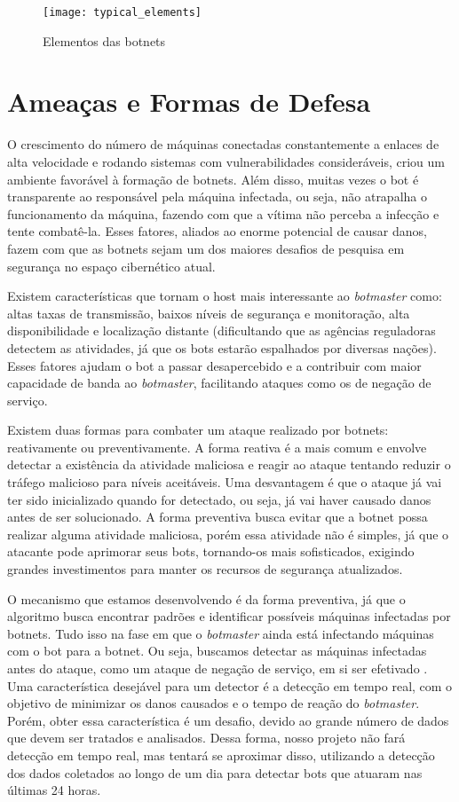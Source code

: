 \begin{figure}
\texttt{[image: typical\_elements]}
\caption[Elementos das botnets]{Elementos das botnets \cite{silva2013botnets}} \label{fig:typical_elements}
\end{figure}

\section{Ameaças e Formas de Defesa}
O crescimento do número de máquinas conectadas constantemente a enlaces de alta velocidade e rodando sistemas com vulnerabilidades consideráveis, criou um ambiente favorável à formação de botnets. Além disso, muitas vezes o bot é transparente ao responsável pela máquina infectada, ou seja, não atrapalha o funcionamento da máquina, fazendo com que a vítima não perceba a infecção e tente combatê-la. Esses fatores, aliados ao enorme potencial de causar danos, fazem com que as botnets sejam um dos maiores desafios de pesquisa em segurança no espaço cibernético atual. \cite{soltani2014survey}

Existem características que tornam o host mais interessante ao \textit{botmaster} como: altas taxas de transmissão, baixos níveis de segurança e monitoração, alta disponibilidade e localização distante (dificultando que as agências reguladoras detectem as atividades, já que os bots estarão espalhados por diversas nações). Esses fatores ajudam o bot a passar desapercebido e a contribuir com maior capacidade de banda ao \textit{botmaster}, facilitando ataques como os de negação de serviço.

Existem duas formas para combater um ataque realizado por botnets: reativamente ou preventivamente. A forma reativa é a mais comum e envolve detectar a existência da atividade maliciosa e reagir ao ataque tentando reduzir o tráfego malicioso para níveis aceitáveis. Uma desvantagem é que o ataque já vai ter sido inicializado quando for detectado, ou seja, já vai haver causado danos antes de ser solucionado. A forma preventiva busca evitar que a botnet possa realizar alguma atividade maliciosa, porém essa atividade não é simples, já que o atacante pode aprimorar seus bots, tornando-os mais sofisticados, exigindo grandes investimentos para manter os recursos de segurança atualizados.

O mecanismo que estamos desenvolvendo é da forma preventiva, já que o algoritmo busca encontrar padrões e identificar possíveis máquinas infectadas por botnets. Tudo isso na fase em que o \textit{botmaster} ainda está infectando máquinas com o bot para a botnet. Ou seja, buscamos detectar as máquinas infectadas antes do ataque, como um ataque de negação de serviço, em si ser efetivado
. Uma característica desejável para um detector é a detecção em tempo real, com o objetivo de minimizar os danos causados e o tempo de reação do \textit{botmaster}. Porém, obter essa característica é um desafio, devido ao grande número de dados que devem ser tratados e analisados. Dessa forma, nosso projeto não fará detecção em tempo real, mas tentará se aproximar disso, utilizando a detecção dos dados coletados ao longo de um dia para detectar bots que atuaram nas últimas 24 horas.

